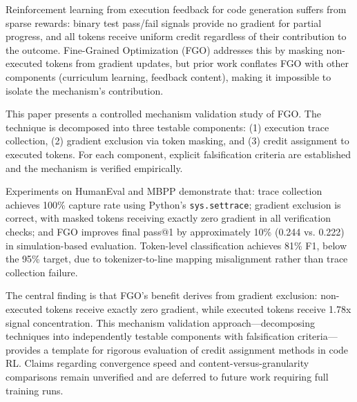 
Reinforcement learning from execution feedback for code generation suffers from sparse rewards: binary test pass/fail signals provide no gradient for partial progress, and all tokens receive uniform credit regardless of their contribution to the outcome. Fine-Grained Optimization (FGO) addresses this by masking non-executed tokens from gradient updates, but prior work conflates FGO with other components (curriculum learning, feedback content), making it impossible to isolate the mechanism's contribution.

This paper presents a controlled mechanism validation study of FGO. The technique is decomposed into three testable components: (1) execution trace collection, (2) gradient exclusion via token masking, and (3) credit assignment to executed tokens. For each component, explicit falsification criteria are established and the mechanism is verified empirically.

Experiments on HumanEval and MBPP demonstrate that: trace collection achieves 100\% capture rate using Python's \texttt{sys.settrace}; gradient exclusion is correct, with masked tokens receiving exactly zero gradient in all verification checks; and FGO improves final pass@1 by approximately 10\% (0.244 vs. 0.222) in simulation-based evaluation. Token-level classification achieves 81\% F1, below the 95\% target, due to tokenizer-to-line mapping misalignment rather than trace collection failure.

The central finding is that FGO's benefit derives from gradient exclusion: non-executed tokens receive exactly zero gradient, while executed tokens receive 1.78x signal concentration. This mechanism validation approach---decomposing techniques into independently testable components with falsification criteria---provides a template for rigorous evaluation of credit assignment methods in code RL. Claims regarding convergence speed and content-versus-granularity comparisons remain unverified and are deferred to future work requiring full training runs.
